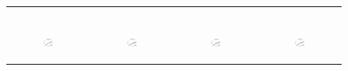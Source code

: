 \begin{figure}[ht]
\begin{tabular}{cccc}
\begin{subfigure}[b]{0.22\textwidth}
	  \end{subfigure} \\
	  \begin{subfigure}[b]{0.22\textwidth}
	  	\includegraphics[width=110pt]{images/speedup_friendster10M_maxgraphcut.eps}
			\caption{}
			\label{appfig:speedup_friendster10M_maxgraphcut}
	  \end{subfigure} &
	  \begin{subfigure}[b]{0.22\textwidth}
	  	\includegraphics[width=110pt]{images/speedup_arabic2005_maxgraphcut.eps}
			\caption{}
			\label{appfig:speedup_arabic2005_maxgraphcut}
	  \end{subfigure} &
	  \begin{subfigure}[b]{0.22\textwidth}
	  	\includegraphics[width=110pt]{images/speedup_uk2005_maxgraphcut.eps}
			\caption{}
			\label{appfig:speedup_uk2005_maxgraphcut}
	  \end{subfigure} &
	  \begin{subfigure}[b]{0.22\textwidth}
	  	\includegraphics[width=110pt]{images/speedup_it2004_maxgraphcut.eps}
			\caption{}
			\label{appfig:speedup_it2004_maxgraphcut}
	  \end{subfigure} \\

\end{tabular}
\end{figure}
